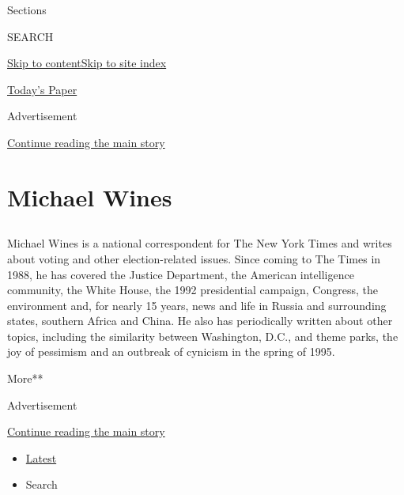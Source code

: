 Sections

SEARCH

\protect\hyperlink{site-content}{Skip to
content}\protect\hyperlink{site-index}{Skip to site index}

\href{https://myaccount.nytimes3xbfgragh.onion/auth/login?response_type=cookie\&client_id=vi}{}

\href{https://www.nytimes3xbfgragh.onion/section/todayspaper}{Today's
Paper}

Advertisement

\protect\hyperlink{after-top}{Continue reading the main story}

\hypertarget{michael-wines}{%
\section{Michael Wines}\label{michael-wines}}

\subsection{}

Michael Wines is a national correspondent for The New York Times and
writes about voting and other election-related issues. Since coming to
The Times in 1988, he has covered the Justice Department, the American
intelligence community, the White House, the 1992 presidential campaign,
Congress, the environment and, for nearly 15 years, news and life in
Russia and surrounding states, southern Africa and China. He also has
periodically written about other topics, including the similarity
between Washington, D.C., and theme parks, the joy of pessimism and an
outbreak of cynicism in the spring of 1995.

More**

Advertisement

\protect\hyperlink{after-mid1}{Continue reading the main story}

\begin{itemize}
\tightlist
\item
  \protect\hyperlink{stream-panel}{Latest}
\item
  Search
\end{itemize}

